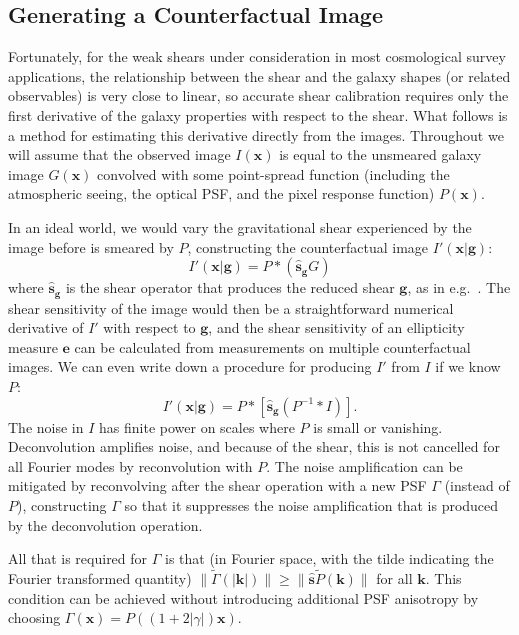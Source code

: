 \documentclass[iop]{emulateapj}
\begin{document}
\subsection{Generating a Counterfactual Image}
\label{sec:counterfactual}
Fortunately, for the weak shears under consideration in most
cosmological survey applications, the relationship between the shear
and the galaxy shapes (or related observables) is very close to
linear, so accurate shear calibration requires only the first
derivative of the galaxy properties with respect to the shear. What
follows is a method for estimating this derivative directly from the
images. Throughout we will assume that the observed image
$I({\mathbf{x}})$ is equal to the unsmeared galaxy image
$G(\mathbf{x})$ convolved with some point-spread function (including the
atmospheric seeing, the optical PSF, and the pixel response function) $P(\mathbf{x})$.

In an ideal world, we would vary the gravitational shear experienced
by the image before is smeared by $P$, constructing the counterfactual
image $I'(\mathbf{x}| {\boldsymbol g})$:
\begin{equation}
  I'({\mathbf{x}}|\mathbf{g}) = P \ast\left( \hat{\mathbf{s}}_{\mathbf{g}}G\right)
\end{equation}
where $\hat{\mathbf{s}}_{\boldsymbol g}$ is the shear operator that
produces the reduced shear $\mathbf{g}$, as in
e.g.~\cite{2002AJ....123..583B}. The shear sensitivity of the image
would then be a straightforward numerical derivative of $I'$ with
respect to $\mathbf{g}$, and the shear sensitivity of an ellipticity
measure $\mathbf{e}$ can be calculated from measurements on multiple
counterfactual images. We can even write down a procedure for
producing $I'$ from $I$ if we know $P$:
\begin{equation}
  I'({\mathbf{x}}|\mathbf{g}) = P \ast \left[\hat{\mathbf{s}}_\mathbf{g}\left( P^{-1} \ast I \right)\right].
\end{equation}
The noise in $I$ has finite power on scales where $P$ is small or
vanishing. Deconvolution amplifies noise, and because of the shear,
this is not cancelled for all Fourier modes by reconvolution with $P$.  The noise
amplification can be mitigated by reconvolving after the shear
operation with a new PSF $\Gamma$ (instead of $P$), constructing
$\Gamma$ so that it suppresses the noise amplification that is
produced by the deconvolution operation.

All that is required for $\Gamma$ is that (in Fourier space, with the
tilde indicating the Fourier transformed quantity)
$\|\tilde{\Gamma}(\mathbf{|k|}) \| \geq
\|\hat{\mathbf{s}}\tilde{P}(\mathbf{k})\|$
for all $\mathbf{k}$.  This condition can be achieved  without introducing additional
PSF anisotropy by choosing
$\Gamma(\mathbf{x}) = P\left((1+2|\gamma|)\mathbf{x}\right)$.
\end{document}
